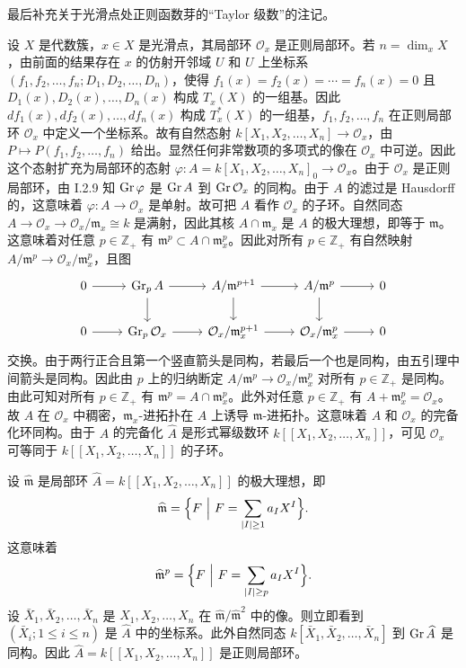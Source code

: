 最后补充关于光滑点处正则函数芽的“Taylor 级数”的注记。

设 $X$ 是代数簇，$x\in X$ 是光滑点，其局部环 $\mathcal{O}_x$ 是正则局部环。若 $n=\dim_xX$，由前面的结果存在 $x$ 的仿射开邻域 $U$ 和 $U$ 上坐标系 $(f_1,f_2,\dots,f_n;D_1,D_2,\dots,D_n)$，使得 $f_1(x)=f_2(x)=\cdots=f_n(x)=0$ 且 $D_1(x),D_2(x),\dots,D_n(x)$ 构成 $T_x(X)$ 的一组基。因此 $df_1(x),df_2(x),\dots,df_n(x)$ 构成 $T^*_x(X)$ 的一组基，$f_1,f_2,\dots,f_n$ 在正则局部环 $\mathcal{O}_x$ 中定义一个坐标系。故有自然态射 $k[X_1,X_2,\dots,X_n]\to\mathcal{O}_x$，由 $P\longmapsto P(f_1,f_2,\dots,f_n)$ 给出。显然任何非常数项的多项式的像在 $\mathcal{O}_x$ 中可逆。因此这个态射扩充为局部环的态射 $\varphi:A=k[X_1,X_2,\dots,X_n]_0\to\mathcal{O}_x$。由于 $\mathcal{O}_x$ 是正则局部环，由 I.2.9 知 $\operatorname{Gr}\varphi$ 是 $\operatorname{Gr} A$ 到 $\operatorname{Gr}\mathcal{O}_x$ 的同构。由于 $A$ 的滤过是 Hausdorff 的，这意味着 $\varphi:A\to\mathcal{O}_x$ 是单射。故可把 $A$ 看作 $\mathcal{O}_x$ 的子环。自然同态 $A\to\mathcal{O}_x\to\mathcal{O}_x/\mathfrak{m}_x\cong k$ 是满射，因此其核 $A\cap\mathfrak{m}_x$ 是 $A$ 的极大理想，即等于 $\mathfrak{m}$。这意味着对任意 $p\in\mathbb{Z}_+$ 有 $\mathfrak{m}^p\subset A\cap\mathfrak{m}_x^p$。因此对所有 $p\in\mathbb{Z}_+$ 有自然映射 $A/\mathfrak{m}^p\to\mathcal{O}_x/\mathfrak{m}_x^p$，且图
$$\begin{tikzcd}
0 \arrow[r] & \Gr_pA \arrow[r] \arrow[d] & A/\mathfrak{m}^{p+1} \arrow[r] \arrow[d] & A/\mathfrak{m}^p \arrow[r] \arrow[d] & 0\\
0 \arrow[r] & \Gr_p\mathcal{O}_x \arrow[r] & \mathcal{O}_x/\mathfrak{m}_x^{p+1} \arrow[r] & \mathcal{O}_x/\mathfrak{m}_x^p \arrow[r] & 0
\end{tikzcd}$$
交换。由于两行正合且第一个竖直箭头是同构，若最后一个也是同构，由五引理中间箭头是同构。因此由 $p$ 上的归纳断定 $A/\mathfrak{m}^p\to\mathcal{O}_x/\mathfrak{m}_x^p$ 对所有 $p\in\mathbb{Z}_+$ 是同构。由此可知对所有 $p\in\mathbb{Z}_+$ 有 $\mathfrak{m}^p=A\cap\mathfrak{m}_x^p$。此外对任意 $p\in\mathbb{Z}_+$ 有 $A+\mathfrak{m}_x^p=\mathcal{O}_x$。故 $A$ 在 $\mathcal{O}_x$ 中稠密，$\mathfrak{m}_x$-进拓扑在 $A$ 上诱导 $\mathfrak{m}$-进拓扑。这意味着 $A$ 和 $\mathcal{O}_x$ 的完备化环同构。由于 $A$ 的完备化 $\widehat A$ 是形式幂级数环 $k[[X_1,X_2,\dots,X_n]]$，可见 $\mathcal{O}_x$ 可等同于 $k[[X_1,X_2,\dots,X_n]]$ 的子环。

设 $\widehat{\mathfrak{m}}$ 是局部环 $\widehat A=k[[X_1,X_2,\dots,X_n]]$ 的极大理想，即
$$\widehat{\mathfrak{m}}=\Bigl\{F\ \Big|\ F=\sum_{|I|\ge1}a_IX^I\Bigr\}.$$
这意味着
$$\widehat{\mathfrak{m}}^p=\Bigl\{F\ \Big|\ F=\sum_{|I|\ge p}a_IX^I\Bigr\}.$$
设 $\bar X_1,\bar X_2,\dots,\bar X_n$ 是 $X_1,X_2,\dots,X_n$ 在 $\widehat{\mathfrak{m}}/\widehat{\mathfrak{m}}^2$ 中的像。则立即看到 $(\bar X_i;1\le i\le n)$ 是 $\widehat A$ 中的坐标系。此外自然同态 $k[\bar X_1,\bar X_2,\dots,\bar X_n]$ 到 $\operatorname{Gr}\widehat A$ 是同构。因此 $\widehat A=k[[X_1,X_2,\dots,X_n]]$ 是正则局部环。

